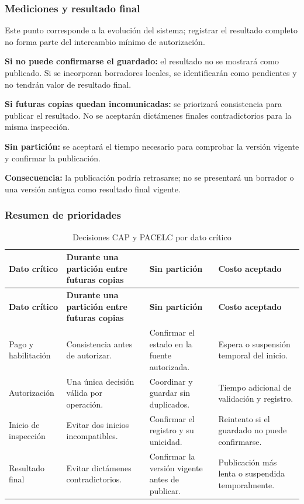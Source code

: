 \documentclass[11pt,a4paper]{article}
\begin{document}
\subsubsection{Mediciones y resultado final}

Este punto corresponde a la evolución del sistema; registrar el resultado completo no forma parte del intercambio mínimo de autorización.

\textbf{Si no puede confirmarse el guardado:} el resultado no se mostrará como publicado. Si se incorporan borradores locales, se identificarán como pendientes y no tendrán valor de resultado final.

\textbf{Si futuras copias quedan incomunicadas:} se priorizará consistencia para publicar el resultado. No se aceptarán dictámenes finales contradictorios para la misma inspección.

\textbf{Sin partición:} se aceptará el tiempo necesario para comprobar la versión vigente y confirmar la publicación.

\textbf{Consecuencia:} la publicación podría retrasarse; no se presentará un borrador o una versión antigua como resultado final vigente.

\subsubsection{Resumen de prioridades}

\begin{xltabular}{\textwidth}{L{2.9cm}XXX}
  \caption{Decisiones CAP y PACELC por dato crítico}\label{tab:cap}\\
  \toprule
  \textbf{Dato crítico} & \textbf{Durante una partición entre futuras copias} & \textbf{Sin partición} & \textbf{Costo aceptado} \\
  \midrule
  \endfirsthead
  \toprule
  \textbf{Dato crítico} & \textbf{Durante una partición entre futuras copias} & \textbf{Sin partición} & \textbf{Costo aceptado} \\
  \midrule
  \endhead
  \bottomrule
  \endfoot
  Pago y habilitación & Consistencia antes de autorizar. & Confirmar el estado en la fuente autorizada. & Espera o suspensión temporal del inicio. \\
  Autorización & Una única decisión válida por operación. & Coordinar y guardar sin duplicados. & Tiempo adicional de validación y registro. \\
  Inicio de inspección & Evitar dos inicios incompatibles. & Confirmar el registro y su unicidad. & Reintento si el guardado no puede confirmarse. \\
  Resultado final & Evitar dictámenes contradictorios. & Confirmar la versión vigente antes de publicar. & Publicación más lenta o suspendida temporalmente. \\
\end{xltabular}
\end{document}

